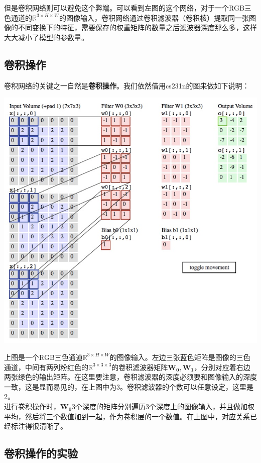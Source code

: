 \documentclass{article}
\begin{document}
但是卷积网络则可以避免这个弊端。可以看到左图的这个网络，对于一个RGB三色通道的$\mathbb{R}^{3 \times H \times W}$的图像输入，卷积网络通过卷积滤波器（卷积核）提取同一张图像的不同变换下的特征，需要保存的权重矩阵的数量之后滤波器深度那么多，这样大大减小了模型的参数量。

\subsection{卷积操作}

卷积网络的关键之一自然是\textbf{卷积操作}。我们依然借用cs231n的图来做如下说明：

\begin{center}
\includegraphics[width=0.8\linewidth]{fig11.jpg}
\end{center}

上图是一个RGB三色通道$\mathbb{R}^{3 \times H \times W}$的图像输入。左边三张蓝色矩阵是图像的三色通道，中间有两列粉红色的$\mathbb{R}^{3 \times 3 \times 3}$的卷积滤波器矩阵$\mathbf{W_0}, \mathbf{W_1}$，分别对应着右边两张绿色的输出矩阵。在这里要注意，卷积滤波器的深度必须要和图像输入的深度一致，这是显而易见的，在上图中为3。卷积滤波器的个数可以任意设定，这里是2。\\

进行卷积操作时，$\mathbf{W_0}$3个深度的矩阵分别遍历3个深度上的图像输入，并且做加权平均，然后将三个数值加到一起，作为卷积层的一个数值。在上图中，对应关系已经标注得很清晰了。\\

\subsection{卷积操作的实验}
\end{document}
